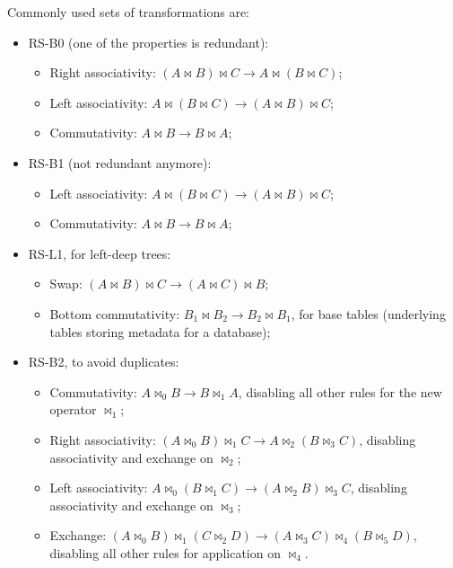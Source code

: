 Commonly used sets of transformations are:
\begin{itemize}
	\item RS-B0 (one of the properties is redundant):
	\begin{itemize}
		\item Right associativity: $(A \bowtie B) \bowtie C \rightarrow A \bowtie (B \bowtie C)$;
		\item Left associativity: $A \bowtie (B \bowtie C) \rightarrow (A \bowtie B) \bowtie C$;
		\item Commutativity: $A \bowtie B \rightarrow B \bowtie A$;
	\end{itemize}
	\item RS-B1 (not redundant anymore):
	\begin{itemize}
		\item Left associativity: $A \bowtie (B \bowtie C) \rightarrow (A \bowtie B) \bowtie C$;
		\item Commutativity: $A \bowtie B \rightarrow B \bowtie A$;
	\end{itemize}
	\item RS-L1, for left-deep trees:
	\begin{itemize}
		\item Swap: $(A \bowtie B) \bowtie C \rightarrow (A \bowtie C) \bowtie B$;
		\item Bottom commutativity: $B_1 \bowtie B_2 \rightarrow B_2 \bowtie B_1$, for base tables (underlying tables storing metadata for a database);
	\end{itemize}
	\item RS-B2, to avoid duplicates:
	\begin{itemize}
		\item Commutativity: $A \bowtie_0 B \rightarrow B \bowtie_1 A$, disabling all other rules for the new operator $\bowtie_1$;
		\item Right associativity: $(A \bowtie_0 B) \bowtie_1 C \rightarrow A \bowtie_2 (B \bowtie_3 C)$, disabling associativity and exchange on $\bowtie_2$;
		\item Left associativity: $A \bowtie_0 (B \bowtie_1 C) \rightarrow (A \bowtie_2 B) \bowtie_3 C$, disabling associativity and exchange on $\bowtie_3$;
		\item Exchange: $(A \bowtie_0 B) \bowtie_1 (C \bowtie_2 D) \rightarrow (A \bowtie_3 C) \bowtie_4 (B \bowtie_5 D)$, disabling all other rules for application on $\bowtie_4$.
	\end{itemize}
\end{itemize}

